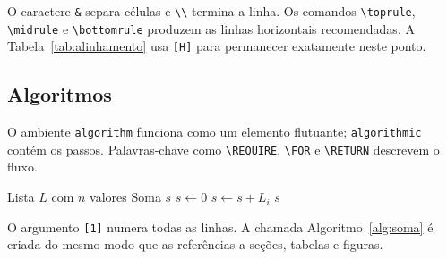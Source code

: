 O caractere \lstinline|&| separa células e \lstinline|\\| termina a linha. Os comandos \lstinline|\toprule|, \lstinline|\midrule| e \lstinline|\bottomrule| produzem as linhas horizontais recomendadas. A Tabela~\ref{tab:alinhamento} usa \lstinline|[H]| para permanecer exatamente neste ponto.

\subsection{Algoritmos}

O ambiente \texttt{algorithm} funciona como um elemento flutuante; \texttt{algorithmic} contém os passos. Palavras-chave como \lstinline|\REQUIRE|, \lstinline|\FOR| e \lstinline|\RETURN| descrevem o fluxo.

\begin{algorithm}[H]
  \caption{Soma dos valores de uma lista}
  \label{alg:soma}
  \begin{algorithmic}[1]
    \REQUIRE Lista $L$ com $n$ valores
    \ENSURE Soma $s$
    \STATE $s \leftarrow 0$
      \STATE $s \leftarrow s + L_i$
    \ENDFOR
    \RETURN $s$
  \end{algorithmic}
\end{algorithm}

O argumento \lstinline|[1]| numera todas as linhas. A chamada Algoritmo~\ref{alg:soma} é criada do mesmo modo que as referências a seções, tabelas e figuras.

